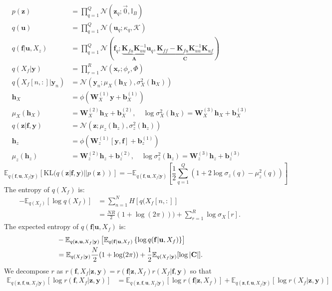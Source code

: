 \documentclass[12pt]{article}
\newcommand{\Kappa}{\mathcal{K}}
\newcommand{\xb}{\mathbf{x}}
\newcommand{\ub}{\mathbf{u}}
\newcommand{\zb}{\mathbf{z}}
\newcommand{\fb}{\mathbf{f}}
\newcommand{\Cb}{\mathbf{C}}
\newcommand{\Ab}{\mathbf{A}}
\newcommand{\yb}{\mathbf{y}}
\newcommand{\Kff}{\mathbf{K}_{ff}}
\newcommand{\Kuu}{\mathbf{K}_{uu}}
\newcommand{\Kuf}{\mathbf{K}_{uf}}
\newcommand{\Kfu}{\mathbf{K}_{fu}}
\newcommand{\Ex}{\mathbb{E}}
\newcommand{\KL}{\mathrm{KL}}
\newcommand{\No}{\mathcal{N}}
\newcommand{\Wb}{\mathbf{W}}
\newcommand{\hb}{\mathbf{h}}
\newcommand{\bb}{\mathbf{b}}
\begin{document}
\begin{align}
p(\zb) &= \prod_{q=1}^Q \mathcal{N}(\zb_q; \vec{0}, \mathbb{I}_B) \\
q(\ub) &= \prod_{q=1}^Q \mathcal{N}(\ub_q; \kappa_q, \Kappa) \\
q(\fb|\ub,X_z) &= \prod_{q=1}^Q \mathcal{N}(\fb_q; \underbrace{\Kfu\Kuu^{-1}}_{\Ab}\ub_q, \underbrace{\Kff-\Kfu\Kuu^{-1}\Kuf}_{\Cb}) \\
q(X_f|\yb) &= \prod_{r=1}^R \mathcal{N}(\xb_r; \phi_r, \Phi) \\
q(X_f[n,:]|\yb_n) &= \No(\yb_n; \mu_X(\hb_X), \sigma^2_X(\hb_X)) \\
\hb_X &= \phi(\Wb^{(1)}_X\yb + \bb^{(1)}_X) \\
\mu_X(\hb_X) &= \Wb^{(2)}_X\hb_X + \bb^{(2)}_X,\quad \log\sigma^2_X(\hb_X) = \Wb^{(3)}_X\hb_X + \bb^{(3)}_X \\
q(\zb|\fb,\yb) &= \No(\zb; \mu_z(\hb_z), \sigma^2_z(\hb_z)) \\
\hb_z &= \phi(\Wb^{(1)}_z[\yb,\fb] + \bb^{(1)}_z) \\
\mu_z(\hb_z) &= \Wb^{(2)}_z\hb_z + \bb^{(2)}_z,\quad \log\sigma^2_z(\hb_z) = \Wb^{(3)}_z\hb_z + \bb^{(3)}_z
\end{align}
%
\begin{equation}
\Ex_{q(\fb,\ub,X_f|\yb)}\left[\KL(q(\zb|\fb,\yb)||p(\zb))\right] = -\Ex_{q(\fb,\ub,X_f|\yb)}\left[ \frac{1}{2}\sum_{q=1}^Q\left( 1 + 2\log\sigma_z(q) - \mu^2_z(q) \right) \right]
\end{equation}
%
The entropy of $q(X_f)$ is:
%
\begin{align}
-\Ex_{q(X_f)}\left[\log q(X_f)\right] &= \sum_{n=1}^N H[q(X_f[n,:]] \\
&= \frac{NR}{2}(1+\log(2\pi))) + \sum_{r=1}^R\log\sigma_X[r].
\end{align}
%
The expected entropy of $q(\fb|\ub,X_f)$ is:
%
\begin{align}
    &- \Ex_{q(\zb,\ub,X_f|\yb)}\left[ \Ex_{q(\fb|\ub,X_f)}\left\{\log q(\fb|\ub,X_f) \right\} \right] \notag \\
    &= \Ex_{q(X_f|\yb)}\frac{N}{2}(1 + \log (2\pi)) + \frac{1}{2} \Ex_{q(X_f|\yb)}[\log|\Cb|].
\end{align}
%
We decompose $r$ as $r(\fb,X_f|\zb,\yb) = r(\fb|\zb,X_f)r(X_f|\fb,\yb)$ so that
%
\begin{align}
\Ex_{q(\zb,\fb,\ub,X_f|\yb)}\left[ \log r(\fb,X_f|\zb,\yb) \right] &= \Ex_{q(\zb,\fb,\ub,X_f|\yb)}\left[\log r(\fb|\zb,X_f)\right] + \Ex_{q(\zb,\fb,\ub,X_f|\yb)}\left[\log r(X_f|\zb,\yb)\right]
\end{align}
\end{document}
